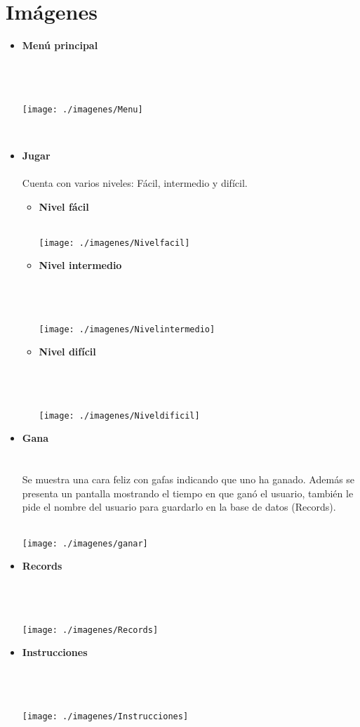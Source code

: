 \documentclass[11pt]{article} %
\begin{document}
\newpage
\section{\fontsize{14}{0} \bf Imágenes}
\begin{itemize}
\item {\bf Menú principal}\\\\\\\\
 \centerline{\texttt{[image: ./imagenes/Menu]}}\\
\newpage
\item {\bf Jugar}\\\\
Cuenta con varios niveles: Fácil, intermedio y difícil.
\begin{itemize}
\item {\bf Nivel fácil}\\\\
  \centerline{\texttt{[image: ./imagenes/Nivelfacil]}}
\newpage
\item {\bf Nivel intermedio}\\\\\\\\
  \centerline{\texttt{[image: ./imagenes/Nivelintermedio]}}
\newpage
\item {\bf Nivel difícil}\\\\\\\\
 \centerline{ \texttt{[image: ./imagenes/Niveldificil]}}
\end{itemize}
\newpage
\item {\bf Gana}\\\\\\
Se muestra una cara feliz con gafas indicando que uno ha ganado. Además se presenta un pantalla mostrando el tiempo en que ganó el usuario, también le pide el nombre del usuario para guardarlo en la base de datos (Records).\\\\
  \centerline{\texttt{[image: ./imagenes/ganar]}}
\newpage
\item {\bf Records}\\\\\\\\
 \centerline{\texttt{[image: ./imagenes/Records]}}
\newpage
\item {\bf Instrucciones}\\\\\\\\
 \centerline{\texttt{[image: ./imagenes/Instrucciones]}}


\end{itemize}
\end{document}
